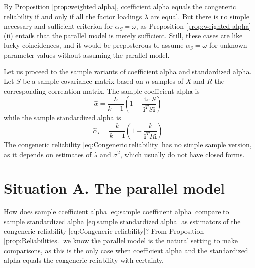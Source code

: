 \documentclass[twoside]{article}
\DeclareMathOperator{\tr}{tr}
\begin{document}

By Proposition \ref{prop:weighted alpha}, coefficient alpha equals the congeneric reliability if and only if all the factor loadings $\lambda$ are equal. But there is no simple necessary and sufficient criterion for $\alpha_S = \omega$, as Proposition \ref{prop:weighted alpha} (ii) entails that the parallel model is merely sufficient. Still, these cases are like lucky coincidences, and it would be preposterous to assume $\alpha_S = \omega$ for unknown parameter values without assuming the parallel model.

Let us proceed to the sample variants of coefficient alpha and standardized
alpha. Let $S$ be a sample covariance matrix based on
$n$ samples of $X$ and $R$ the corresponding correlation matrix.
The sample coefficient alpha is 
\begin{equation}
\hat{\alpha}=\frac{k}{k-1}\left(1-\frac{\tr{S}}{\mathbf{i}^{T}S\mathbf{i}}\right)\label{eq:sample coefficient alpha}
\end{equation}
while the sample standardized alpha is
\begin{equation}
\hat{\alpha}_s=\frac{k}{k-1}\left(1-\frac{k}{\mathbf{i}^{T}R\mathbf{i}}\right)\label{eq:sample standardized alpha}
\end{equation}
The congeneric reliability \eqref{eq:Congeneric reliability} has no
simple sample version, as it depends on estimates of $\lambda$ and
$\sigma^2$, which usually do not have closed forms.

\section{Situation A. The parallel model}
\label{sec:argument A}

How does sample coefficient alpha \eqref{eq:sample coefficient alpha} compare to sample standardized alpha \eqref{eq:sample standardized alpha} as estimators of the congeneric reliability \eqref{eq:Congeneric reliability}? From Proposition \ref{prop:Reliabilities.} we know the parallel model is the natural setting to make comparisons, as this is the only case when coefficient alpha and the standardized alpha equals the congeneric reliability with certainty.
\end{document}
